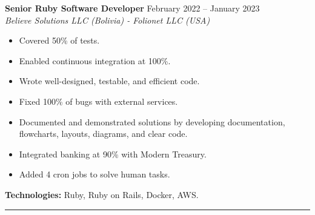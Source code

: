 \textbf{Senior Ruby Software Developer} \hfill February 2022 -- January 2023\\
\textit{Believe Solutions LLC (Bolivia) - Folionet LLC (USA)}\\
\begin{itemize}
    \setlength{\itemsep}{0pt} %
    \setlength{\topsep}{0pt}  %
    \setlength{\parsep}{0pt}  %
    \setlength{\partopsep}{0pt} %
    \item Covered 50\% of tests.
    \item Enabled continuous integration at 100\%.
    \item Wrote well-designed, testable, and efficient code.
    \item Fixed 100\% of bugs with external services.
    \item Documented and demonstrated solutions by developing documentation, flowcharts, layouts, diagrams, and clear code.
    \item Integrated banking at 90\% with Modern Treasury.
    \item Added 4 cron jobs to solve human tasks.
\end{itemize}
\textbf{Technologies:} Ruby, Ruby on Rails, Docker, AWS.
\hrule
\vspace{1em}

